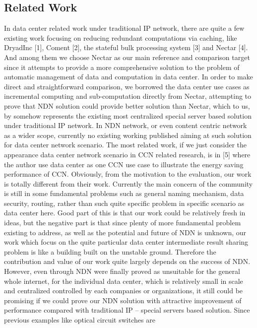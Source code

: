 \documentclass[journal]{IEEEtran}
\begin{document}
\subsection{Related Work}
In data center related work under traditional IP network, there are 
quite a few existing work focusing on reducing redundant computations 
via caching, like DryadInc [1], Coment [2], the stateful bulk 
processing system [3] and Nectar [4]. And among them we choose Nectar 
as our main reference and comparison target since it attempts to 
provide a more comprehensive solution to the problem of automatic 
management of data and computation in data center. In order to make 
direct and straightforward comparison, we borrowed the data center use 
cases as incremental computing and sub-computation directly from 
Nectar, attempting to prove that NDN solution could provide better 
solution than Nectar, which to us, by somehow represents the existing 
most centralized special server based solution under traditional IP 
network. 
In NDN network, or even content centric network as a wider scope, 
currently no existing working published aiming at such solution for 
data center network scenario. The most related work, if we just 
consider the appearance data center network scenario in CCN related 
research, is in [5] where the author use data center as one CCN use 
case to illustrate the energy saving performance of CCN. Obviously, 
from the motivation to the evaluation, our work is totally different 
from their work. 
Currently the main concern of the community is still in some 
fundamental problems such as general naming mechanism, data security, 
routing, rather than such quite specific problem in specific scenario 
as data center here. Good part of this is that our work could be 
relatively fresh in ideas, but the negative part is that since plenty 
of more fundamental problem existing to address, as well as the 
potential and future of NDN is unknown, our work which focus on the 
quite particular data center intermediate result sharing problem is 
like a building built on the unstable ground. Therefore the 
contribution and value of our work quite largely depends on the 
success of NDN. However, even through NDN were finally proved as 
unsuitable for the general whole internet, for the individual data 
center, which is relatively small in scale and centralized controlled 
by each companies or organizations, it still could be promising if we 
could prove our NDN solution with attractive improvement of 
performance compared with traditional IP – special servers based 
solution. Since previous examples like optical circuit switches are 
\end{document}
